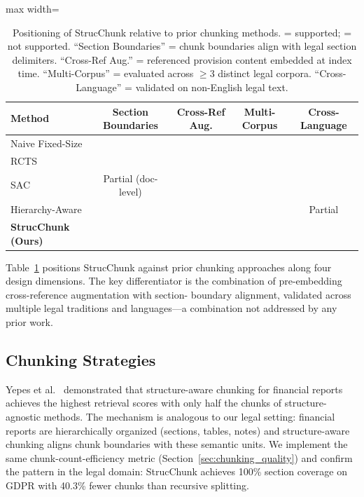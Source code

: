\documentclass[sn-mathphys,Numbered]{sn-jnl}%
\newcommand{\cmark}{\ding{51}}%
\newcommand{\xmark}{\ding{55}}%
\begin{document}
\begin{table}[htbp]
\centering
\small
\begin{adjustbox}{max width=\textwidth}
\begin{tabular}{lcccc}
\toprule
\textbf{Method} & \textbf{Section Boundaries} & \textbf{Cross-Ref Aug.}
  & \textbf{Multi-Corpus} & \textbf{Cross-Language} \\
\midrule
Naive Fixed-Size        & \xmark & \xmark & \xmark & \xmark \\
RCTS                    & \xmark & \xmark & \xmark & \xmark \\
SAC \cite{reuter-etal-2025-towards} & Partial (doc-level) & \xmark & \xmark & \xmark \\
Hierarchy-Aware \cite{akarajaradwong2025nitibenchcomprehensivestudyllm} & \cmark & \xmark & \xmark & Partial \\
\textbf{StrucChunk (Ours)} & \cmark & \cmark & \cmark & \cmark \\
\bottomrule
\end{tabular}
\end{adjustbox}
\caption{Positioning of StrucChunk relative to prior chunking methods.
  \cmark = supported; \xmark = not supported.  ``Section Boundaries'' =
  chunk boundaries align with legal section delimiters.
  ``Cross-Ref Aug.'' = referenced provision content embedded at index time.
  ``Multi-Corpus'' = evaluated across $\geq$3 distinct legal corpora.
  ``Cross-Language'' = validated on non-English legal text.}
\label{tab:positioning}
\end{table}

Table~\ref{tab:positioning} positions StrucChunk against prior chunking
approaches along four design dimensions.  The key differentiator is the
combination of pre-embedding cross-reference augmentation with section-
boundary alignment, validated across multiple legal traditions and
languages---a combination not addressed by any prior work.

\subsection{Chunking Strategies}
\label{sec:related_chunking}

Yepes et al.~\cite{yepes2024financialreportchunkingeffective} demonstrated that structure-aware chunking for
financial reports achieves the highest retrieval scores with only half the
chunks of structure-agnostic methods.  The mechanism is analogous to our
legal setting: financial reports are hierarchically organized (sections,
tables, notes) and structure-aware chunking aligns chunk boundaries with
these semantic units.  We implement the same chunk-count-efficiency metric
(Section~\ref{sec:chunking_quality}) and confirm the pattern in the legal
domain: StrucChunk achieves 100\% section coverage on GDPR with 40.3\%
fewer chunks than recursive splitting.
\end{document}
